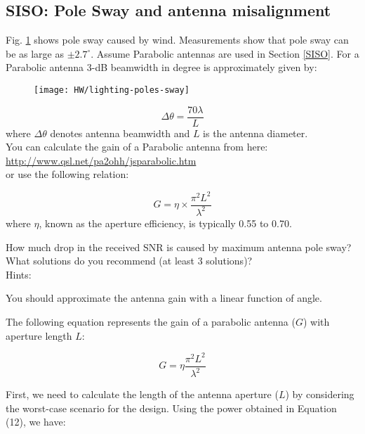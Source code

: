 \documentclass[12pt,onecolumn,a4paper]{article}
\begin{document}
\subsection{SISO:  Pole Sway and antenna misalignment}
{\color{questioncolor}


Fig. \ref{fig:lighting-poles-sway} shows pole sway caused by wind. Measurements show that pole sway can be as large as $\pm2.7^\circ$. Assume Parabolic antennas are used in Section \ref{SISO}. For a Parabolic antenna 3-dB beamwidth in degree is approximately given by:

\begin{figure}[H]
	\centering
	\texttt{[image: HW/lighting-poles-sway]}
	\caption{}
	\label{fig:lighting-poles-sway}
\end{figure}


\begin{equation}
	\Delta\theta=\frac{70\lambda}{L} 
\end{equation}
where $\Delta\theta$ denotes antenna beamwidth and $L$ is the antenna diameter.\\
You can calculate the gain of a Parabolic antenna from here:\\ \url{http://www.qsl.net/pa2ohh/jsparabolic.htm}
\\ or use the following relation: 

\begin{equation}
	G=\eta\times\frac{\pi^2L^2}{\lambda^2}
\end{equation}
where $\eta$, known as the aperture efficiency, is typically 0.55 to 0.70.


How much drop in the received SNR is caused by maximum antenna pole sway? What solutions do you recommend (at least 3 solutions)?\\

\noindent Hints: 

You should approximate the antenna gain with a linear function of angle.

}



The following equation represents the gain of a parabolic antenna (\(G\)) with aperture length \(L\):

\begin{equation}
	G = \eta \frac{\pi^2 L^2}{\lambda^2}
\end{equation}

First, we need to calculate the length of the antenna aperture (\(L\)) by considering the worst-case scenario for the design. Using the power obtained in Equation (12), we have:
\end{document}
